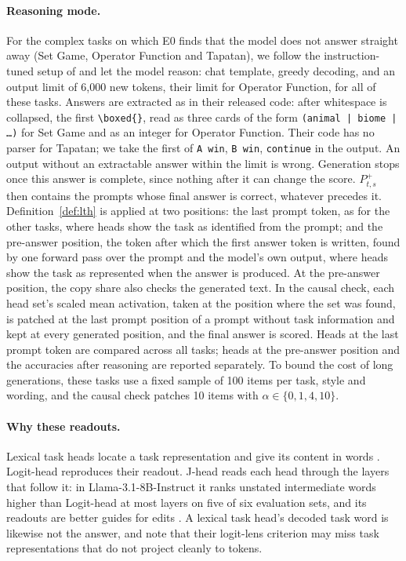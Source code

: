 \documentclass[11pt,a4paper]{article}
\begin{document}
\paragraph{Reasoning mode.}\label{sec:reasoning} For the complex tasks on which E0 finds that the model does not answer straight away (Set Game, Operator Function and Tapatan), we follow the instruction-tuned setup of \citet[App.~A]{fu2026rules} and let the model reason: chat template, greedy decoding, and an output limit of 6,000 new tokens, their limit for Operator Function, for all of these tasks. Answers are extracted as in their released code: after whitespace is collapsed, the first \texttt{\textbackslash boxed\{\}}, read as three cards of the form \texttt{(animal | biome | \ldots)} for Set Game and as an integer for Operator Function. Their code has no parser for Tapatan; we take the first of \texttt{A win}, \texttt{B win}, \texttt{continue} in the output. An output without an extractable answer within the limit is wrong. Generation stops once this answer is complete, since nothing after it can change the score. $P^{+}_{t,s}$ then contains the prompts whose final answer is correct, whatever precedes it. Definition~\ref{def:lth} is applied at two positions: the last prompt token, as for the other tasks, where heads show the task as identified from the prompt; and the pre-answer position, the token after which the first answer token is written, found by one forward pass over the prompt and the model's own output, where heads show the task as represented when the answer is produced. At the pre-answer position, the copy share also checks the generated text. In the causal check, each head set's scaled mean activation, taken at the position where the set was found, is patched at the last prompt position of a prompt without task information and kept at every generated position, and the final answer is scored. Heads at the last prompt token are compared across all tasks; heads at the pre-answer position and the accuracies after reasoning are reported separately. To bound the cost of long generations, these tasks use a fixed sample of 100 items per task, style and wording, and the causal check patches 10 items with $\alpha\in\{0,1,4,10\}$.

\paragraph{Why these readouts.} Lexical task heads locate a task representation and give its content in words \citep{yang2026shared}. Logit-head reproduces their readout. J-head reads each head through the layers that follow it: in Llama-3.1-8B-Instruct it ranks unstated intermediate words higher than Logit-head at most layers on five of six evaluation sets, and its readouts are better guides for edits \citep[Secs.~3--4]{merlo2026headjlens}. A lexical task head's decoded task word is likewise not the answer, and \citet[Sec.~4]{yang2026shared} note that their logit-lens criterion may miss task representations that do not project cleanly to tokens.
\end{document}
